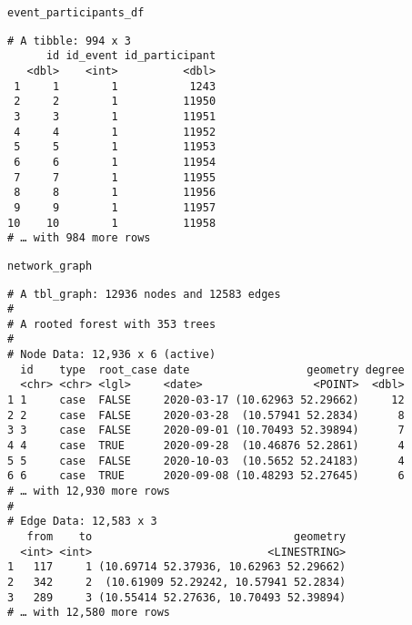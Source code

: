 \documentclass[
  8pt,
  ignorenonframetext,
]{beamer}
\begin{document}
\begin{frame}[fragile]
\texttt{event\_participants\_df}

\vspace{0.2cm}

\tiny

\begin{verbatim}
# A tibble: 994 x 3
      id id_event id_participant
   <dbl>    <int>          <dbl>
 1     1        1           1243
 2     2        1          11950
 3     3        1          11951
 4     4        1          11952
 5     5        1          11953
 6     6        1          11954
 7     7        1          11955
 8     8        1          11956
 9     9        1          11957
10    10        1          11958
# … with 984 more rows
\end{verbatim}

\normalsize
\end{frame}

\begin{frame}[fragile]
\texttt{network\_graph}

\vspace{0.2cm}

\tiny

\begin{verbatim}
# A tbl_graph: 12936 nodes and 12583 edges
#
# A rooted forest with 353 trees
#
# Node Data: 12,936 x 6 (active)
  id    type  root_case date                  geometry degree
  <chr> <chr> <lgl>     <date>                 <POINT>  <dbl>
1 1     case  FALSE     2020-03-17 (10.62963 52.29662)     12
2 2     case  FALSE     2020-03-28  (10.57941 52.2834)      8
3 3     case  FALSE     2020-09-01 (10.70493 52.39894)      7
4 4     case  TRUE      2020-09-28  (10.46876 52.2861)      4
5 5     case  FALSE     2020-10-03  (10.5652 52.24183)      4
6 6     case  TRUE      2020-09-08 (10.48293 52.27645)      6
# … with 12,930 more rows
#
# Edge Data: 12,583 x 3
   from    to                               geometry
  <int> <int>                           <LINESTRING>
1   117     1 (10.69714 52.37936, 10.62963 52.29662)
2   342     2  (10.61909 52.29242, 10.57941 52.2834)
3   289     3 (10.55414 52.27636, 10.70493 52.39894)
# … with 12,580 more rows
\end{verbatim}

\normalsize
\end{frame}
\end{document}
